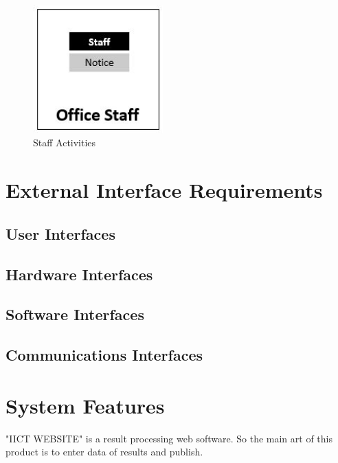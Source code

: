 \documentclass{scrreprt}
\begin{document}
\begin{figure}[h!]
    \centering
    \includegraphics[width=5cm]{6.JPG}
    \caption{Staff Activities}
    \label{fig:Staff Activities}
\end{figure}

\chapter{External Interface Requirements}

\section{User Interfaces}
\lipsum[1-1]
\section{Hardware Interfaces}
\lipsum[1-1]
\section{Software Interfaces}
\lipsum[1-1]
\section{Communications Interfaces}
\lipsum[1-1]

\chapter{System Features}
"IICT WEBSITE" is a result processing web software. So the main art of this product is to enter data of results and publish. 
\end{document}
